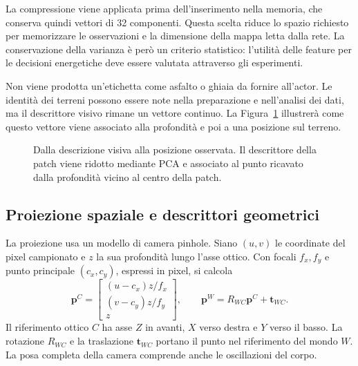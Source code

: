 La compressione viene applicata prima dell'inserimento nella memoria, che conserva quindi vettori di 32 componenti. Questa scelta riduce lo spazio richiesto per memorizzare le osservazioni e la dimensione della mappa letta dalla rete. La conservazione della varianza è però un criterio statistico: l'utilità delle feature per le decisioni energetiche deve essere valutata attraverso gli esperimenti.

Non viene prodotta un'etichetta come asfalto o ghiaia da fornire all'actor. Le identità dei terreni possono essere note nella preparazione e nell'analisi dei dati, ma il descrittore visivo rimane un vettore continuo. La Figura~\ref{fig:metodo-patch-proiezione} illustrerà come questo vettore viene associato alla profondità e poi a una posizione sul terreno.

\begin{figure}[tbp]
    \centering
    \caption[Associazione fra patch visiva e punto nello spazio]{Dalla descrizione visiva alla posizione osservata. Il descrittore della patch viene ridotto mediante PCA e associato al punto ricavato dalla profondità vicino al centro della patch.}
    \label{fig:metodo-patch-proiezione}
\end{figure}

\subsection{Proiezione spaziale e descrittori geometrici}

La proiezione usa un modello di camera pinhole. Siano $(u,v)$ le coordinate del pixel campionato e $z$ la sua profondità lungo l'asse ottico. Con focali $f_x,f_y$ e punto principale $(c_x,c_y)$, espressi in pixel, si calcola
\begin{equation}
    \mathbf p^C=
    \begin{bmatrix}
        (u-c_x)z/f_x\\
        (v-c_y)z/f_y\\
        z
    \end{bmatrix},
    \qquad
    \mathbf p^W=R_{WC}\mathbf p^C+\mathbf t_{WC}.
    \label{eq:metodo-proiezione-rgbd}
\end{equation}
Il riferimento ottico $C$ ha asse $Z$ in avanti, $X$ verso destra e $Y$ verso il basso. La rotazione $R_{WC}$ e la traslazione $\mathbf t_{WC}$ portano il punto nel riferimento del mondo $W$. La posa completa della camera comprende anche le oscillazioni del corpo.

